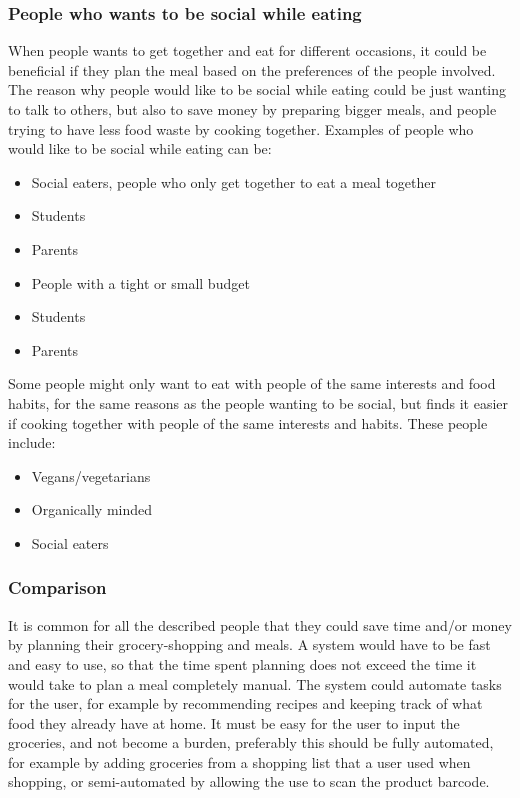\subsubsection{People who wants to be social while eating}
When people wants to get together and eat for different occasions, it could be beneficial if they plan the meal based on the preferences of the people involved. The reason why people would like to be social while eating could be just wanting to talk to others, but also to save money by preparing bigger meals, and people trying to have less food waste by cooking together. Examples of people who would like to be social while eating can be:
\begin{itemize}
\item Social eaters, people who only get together to eat a meal together
\item Students
\item Parents
\item People with a tight or small budget
\item Students
\item Parents
\end{itemize}

Some people might only want to eat with people of the same interests and food habits, for the same reasons as the people wanting to be social, but finds it easier if cooking together with people of the same interests and habits. These people include:

\begin{itemize}
\item Vegans/vegetarians
\item Organically minded
\item Social eaters
\end{itemize}

\subsubsection{Comparison}
It is common for all the described people that they could save time and/or money by planning their grocery-shopping and meals. A system would have to be fast and easy to use, so that the time spent planning does not exceed the time it would take to plan a meal completely manual. The system could automate tasks for the user, for example by recommending recipes and keeping track of what food they already have at home. It must be easy for the user to input the groceries, and not become a burden, preferably this should be fully automated, for example by adding groceries from a shopping list that a user used when shopping, or semi-automated by allowing the use to scan the product barcode.